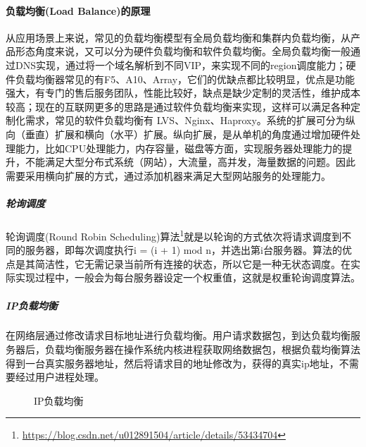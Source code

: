 \documentclass[../../../interview-questions.tex]{subfiles}
\begin{document}
\paragraph{负载均衡(Load Balance)的原理}

从应用场景上来说，常见的负载均衡模型有全局负载均衡和集群内负载均衡，从产品形态角度来说，又可以分为硬件负载均衡和软件负载均衡。全局负载均衡一般通过DNS实现，通过将一个域名解析到不同VIP，来实现不同的region调度能力；硬件负载均衡器常见的有F5、A10、Array，它们的优缺点都比较明显，优点是功能强大，有专门的售后服务团队，性能比较好，缺点是缺少定制的灵活性，维护成本较高；现在的互联网更多的思路是通过软件负载均衡来实现，这样可以满足各种定制化需求，常见的软件负载均衡有 LVS、Nginx、Haproxy。系统的扩展可分为纵向（垂直）扩展和横向（水平）扩展。纵向扩展，是从单机的角度通过增加硬件处理能力，比如CPU处理能力，内存容量，磁盘等方面，实现服务器处理能力的提升，不能满足大型分布式系统（网站），大流量，高并发，海量数据的问题。因此需要采用横向扩展的方式，通过添加机器来满足大型网站服务的处理能力。

\subparagraph{轮询调度}

轮询调度(Round Robin Scheduling)算法\footnote{\url{https://blog.csdn.net/u012891504/article/details/53434704}}就是以轮询的方式依次将请求调度到不同的服务器，即每次调度执行i = (i + 1) mod n，并选出第i台服务器。算法的优点是其简洁性，它无需记录当前所有连接的状态，所以它是一种无状态调度。在实际实现过程中，一般会为每台服务器设定一个权重值，这就是权重轮询调度算法。

\subparagraph{IP负载均衡}

在网络层通过修改请求目标地址进行负载均衡。用户请求数据包，到达负载均衡服务器后，负载均衡服务器在操作系统内核进程获取网络数据包，根据负载均衡算法得到一台真实服务器地址，然后将请求目的地址修改为，获得的真实ip地址，不需要经过用户进程处理。

\begin{figure}[htpb]
	\centering
	\caption{IP负载均衡}
	\label{fig:iploadbalance}
\end{figure}
\end{document}
